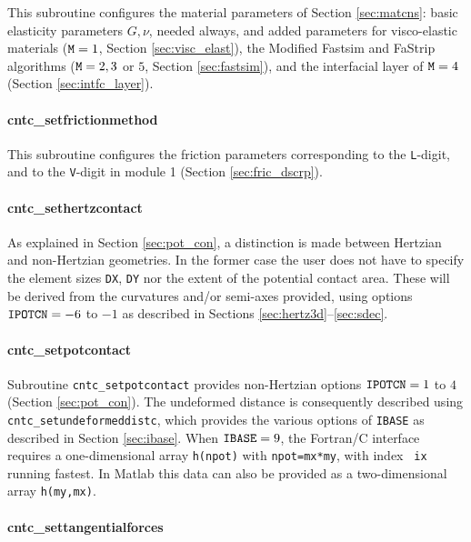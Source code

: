 \documentclass[12pt]{report}
\begin{document}
This subroutine configures the material parameters of Section
\ref{sec:matcns}: basic elasticity parameters $G, \nu$, needed always, and
added parameters for visco-elastic materials (${\tt M}=1$, Section
\ref{sec:visc_elast}), the Modified Fastsim and FaStrip algorithms (${\tt 
M}=2, 3$ or $5$, Section \ref{sec:fastsim}), and the interfacial layer
of ${\tt M}=4$ (Section \ref{sec:intfc_layer}).

\paragraph{cntc\_setfrictionmethod}

This subroutine configures the friction parameters corresponding to the
{\tt L}-digit, and to the {\tt V}-digit in module 1 (Section
\ref{sec:fric_dscrp}).

\paragraph{cntc\_sethertzcontact}

As explained in Section \ref{sec:pot_con}, a distinction is made between
Hertzian and non-Hertzian geometries. In the former case the user does not
have to specify the element sizes {\tt DX}, {\tt DY} nor the extent of the
potential contact area. These will be derived from the curvatures and/or
semi-axes provided, using options ${\tt IPOTCN}=-6$ to $-1$ as described
in Sections \ref{sec:hertz3d}--\ref{sec:sdec}.

\paragraph{cntc\_setpotcontact}

Subroutine {\tt cntc\_setpotcontact} provides non-Hertzian options
${\tt IPOTCN}=1$ to $4$ (Section \ref{sec:pot_con}). The undeformed
distance is consequently described using {\tt cntc\_set\-un\-de\-formed\-distc},
which provides the various options of {\tt IBASE} as described in Section
\ref{sec:ibase}.  When ${\tt IBASE}=9$, the Fortran/C interface requires a
one-dimensional array {\tt h(npot)} with {\tt npot=mx*my}, with index {\tt
ix} running fastest. In Matlab this data can also be provided as a
two-dimensional array {\tt h(my,mx)}.

\paragraph{cntc\_settangentialforces}
\end{document}
